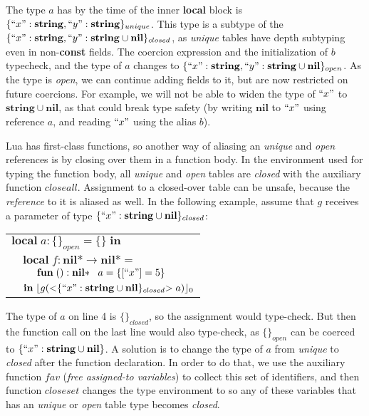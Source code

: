 \documentclass[10pt]{sigplanconf}
\newcommand{\Nil}{\mathbf{nil}}
\newcommand{\String}{\mathbf{string}}
\newcommand{\Void}{\Nil{*}}
\begin{document}
The type $a$ has by the time of the inner {\bf local} block
is $\{``x":\String, ``y":\String\}_{unique}$. This type is
a subtype of the $\{``x":\String, ``y":\String\cup\Nil\}_{closed}$, as {\em unique} tables
have depth subtyping even in non-{\bf const} fields.
The coercion expression and the initialization of $b$
typecheck, and the type of $a$ changes to
$\{``x":\String, ``y":\String\cup\Nil\}_{open}$.
As the type is {\em open}, we can continue adding fields
to it, but are now restricted on future coercions. For
example, we will not be able to widen the type of $``x"$
to $\String \cup \Nil$, as that could break type safety
(by writing $\Nil$ to $``x"$ using reference $a$, and reading
$``x"$ using the alias $b$).

Lua has first-class functions, so another way of aliasing
an {\em unique} and {\em open} references is by closing
over them in a function body. In the environment used for
typing the function body, all {\em unique} and {\em open}
tables are {\em closed} with the auxiliary function $closeall$.
Assignment to a closed-over table can be unsafe, because the {\em reference} to it is aliased as well. In the following
example, assume that $g$ receives a parameter of type
$\{ ``x": \String \cup \Nil\}_{closed}$:
{\small
\begin{center}
	\begin{tabular}{llll}
		\multicolumn{4}{l}{$\mathbf{local} \; a:\{\}_{open}
			= \{\} \; \mathbf{in}$}\\
		& \multicolumn{3}{l}{$\mathbf{local} \; f:\Void \rightarrow \Void =$}\\
		& & \multicolumn{2}{l}{$\mathbf{fun} \; ():\Void\;\;\;
		 a = \{[``x"]=5\} $}\\
		& \multicolumn{3}{l}{$\mathbf{in} \; \lfloor g({<}\{``x":
			 \String \cup \Nil\}_{closed}{>} \; a) \rfloor_{0}$}
	\end{tabular}
\end{center}
}

The type of $a$ on line 4 is $\{\}_{closed}$, so the assignment
would type-check. But then the function call on the last line
would also type-check, as $\{\}_{open}$ can be coerced to
$\{ ``x": \String \cup \Nil\}$. A solution is to change the
type of $a$ from {\em unique} to {\em closed} after the function
declaration. In order to do that, we use the auxiliary function
$fav$ ({\em free assigned-to variables}) to collect this
set of identifiers, and then function $closeset$ changes
the type environment to so any of these variables that
has an {\em unique} or {\em open} table type becomes {\em closed}.
\end{document}
